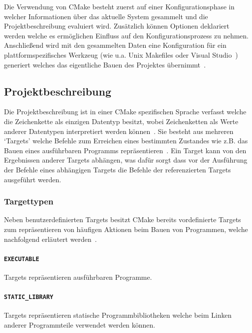 \documentclass[german,proseminar,hyperref,utf8,lof]{zihpub}
\begin{document}
    Die Verwendung von CMake besteht zuerst auf einer Konfigurationsphase in welcher Informationen
    über das aktuelle System gesammelt und die Projektbeschreibung evaluiert wird.
    Zusätzlich können Optionen deklariert werden welche es ermöglichen Einfluss auf den
    Konfigurationsprozess zu nehmen.
    Anschlie{\ss}end wird mit den gesammelten Daten eine Konfiguration für ein plattformspezifisches Werkzeug
    (wie u.a. Unix Makefiles oder Visual Studio~)
    generiert welches das eigentliche Bauen des Projektes
    übernimmt~.

    \subsection{Projektbeschreibung}
    Die Projektbeschreibung ist in einer CMake spezifischen Sprache verfasst welche die Zeichenkette
    als einzigen Datentyp besitzt, wobei Zeichenketten als Werte anderer Datentypen interpretiert
    werden können~.
    Sie besteht aus mehreren `Targets' welche Befehle zum Erreichen eines bestimmten Zustandes wie
    z.B. das Bauen eines ausführbaren Programms repräsentieren~.
    Ein Target kann von den Ergebnissen anderer Targets abhängen, was dafür sorgt dass vor der
    Ausführung der Befehle eines abhängigen Targets die Befehle der referenzierten Targets ausgeführt werden.

    \subsubsection{Targettypen}
    Neben benutzerdefinierten Targets besitzt CMake bereits vordefinierte Targets zum repräsentieren
    von häufigen Aktionen beim Bauen von Programmen, welche nachfolgend erläutert
    werden~.

    \paragraph{\texttt{EXECUTABLE}} Targets repräsentieren ausführbaren Programme.

    \paragraph{\texttt{STATIC\_LIBRARY}} Targets repräsentieren statische Programmbibliotheken welche
    beim Linken anderer Programmteile verwendet werden können.
\end{document}
